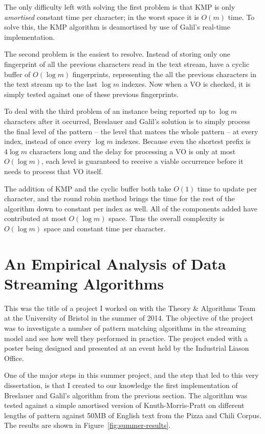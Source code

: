 \documentclass[ %
                    author={Dominic Joseph Moylett},
                    degree={MEng},
                     title={Dictionary Matching with Fingerprints},
                  subtitle={An Empirical Analysis},
                      type={Research},
                      year={2014} ]{dissertation}
\begin{document}
The only difficulty left with solving the first problem is that KMP is only \textit{amortised} constant time per character; in the worst space it is $O(m)$ time. To solve this, the KMP algorithm is deamortised by use of Galil's\cite{Galil:1981:SMR:322234.322244} real-time implementation.

The second problem is the easiest to resolve. Instead of storing only one fingerprint of all the previous characters read in the text stream, have a cyclic buffer of $O(\log m)$ fingerprints, representing the all the previous characters in the text stream up to the last $\log m$ indexes. Now when a VO is checked, it is simply tested against one of these previous fingerprints.

To deal with the third problem of an instance being reported up to $\log m$ characters after it occurred, Breslauer and Galil's solution is to simply process the final level of the pattern -- the level that matces the whole pattern -- at every index, instead of once every $\log m$ indexes. Because even the shortest prefix is $4\log m$ characters long and the delay for processing a VO is only at most $O(\log m)$, each level is guaranteed to receive a viable occurrence before it needs to process that VO itself.

The addition of KMP and the cyclic buffer both take $O(1)$ time to update per character, and the round robin method brings the time for the rest of the algorithm down to constant per index as well. All of the components added have contributed at most $O(\log m)$ space. Thus the overall complexity is $O(\log m)$ space and constant time per character.

\section{An Empirical Analysis of Data Streaming Algorithms}
\label{sec:summer}

This was the title of a project I worked on with the Theory \& Algorithms Team at the University of Bristol in the summer of 2014. The objective of the project was to investigate a number of pattern matching algorithms in the streaming model and see how well they performed in practice. The project ended with a poster being designed and presented at an event held by the Industrial Liason Office.

One of the major steps in this summer project, and the step that led to this very dissertation, is that I created to our knowledge the first implementation of Breslauer and Galil's algorithm from the previous section. The algorithm was tested against a simple amortised version of Knuth-Morris-Pratt on different lengths of pattern against 50MB of English text from the Pizza and Chili Corpus. The results are shown in Figure~\ref{fig:summer-results}.
\end{document}
